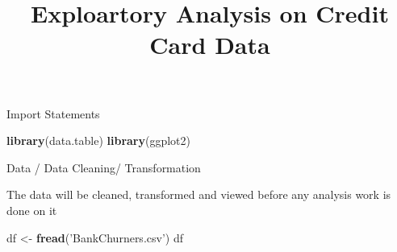 \documentclass[]{article}
\title{Exploartory Analysis on Credit Card Data}
\author{}
\date{\vspace{-2.5em}}
\newenvironment{Shaded}{\begin{snugshade}}{\end{snugshade}}
\newcommand{\KeywordTok}[1]{\textcolor[rgb]{0.13,0.29,0.53}{\textbf{#1}}}
\newcommand{\NormalTok}[1]{#1}
\newcommand{\StringTok}[1]{\textcolor[rgb]{0.31,0.60,0.02}{#1}}
\begin{document}
\maketitle

Import Statements

\begin{Shaded}
\begin{Highlighting}[]
\KeywordTok{library}\NormalTok{(data.table)}
\KeywordTok{library}\NormalTok{(ggplot2)}
\end{Highlighting}
\end{Shaded}

Data / Data Cleaning/ Transformation

The data will be cleaned, transformed and viewed before any analysis
work is done on it

\begin{Shaded}
\begin{Highlighting}[]
\NormalTok{df <-}\StringTok{ }\KeywordTok{fread}\NormalTok{(}\StringTok{'BankChurners.csv'}\NormalTok{)}
\NormalTok{df}
\end{Highlighting}
\end{Shaded}
\end{document}
